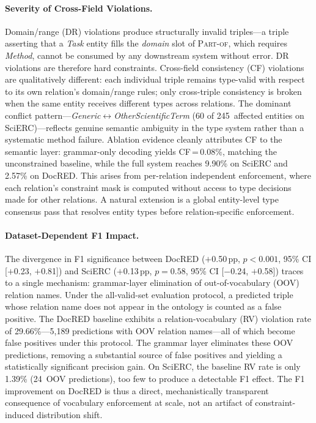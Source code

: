 \paragraph{Severity of Cross-Field Violations.}
Domain/range (DR) violations produce structurally invalid triples---a triple asserting that a \emph{Task} entity fills the \emph{domain} slot of \textsc{Part-of}, which requires \emph{Method}, cannot be consumed by any downstream system without error.
DR violations are therefore hard constraints.
Cross-field consistency (CF) violations are qualitatively different: each individual triple remains type-valid with respect to its own relation's domain/range rules; only cross-triple consistency is broken when the same entity receives different types across relations.
The dominant conflict pattern---\emph{Generic}$\leftrightarrow$\emph{OtherScientificTerm} (60 of 245~affected entities on SciERC)---reflects genuine semantic ambiguity in the type system rather than a systematic method failure.
Ablation evidence cleanly attributes CF to the semantic layer: grammar-only decoding yields CF\,=\,0.08\%, matching the unconstrained baseline, while the full system reaches 9.90\% on SciERC and 2.57\% on DocRED.
This arises from per-relation independent enforcement, where each relation's constraint mask is computed without access to type decisions made for other relations.
A natural extension is a global entity-level type consensus pass that resolves entity types before relation-specific enforcement.


\paragraph{Dataset-Dependent F1 Impact.}
The divergence in F1 significance between DocRED ($+$0.50\,pp, $p < 0.001$, 95\% CI [$+$0.23, $+$0.81]) and SciERC ($+$0.13\,pp, $p = 0.58$, 95\% CI [$-$0.24, $+$0.58]) traces to a single mechanism: grammar-layer elimination of out-of-vocabulary (OOV) relation names.
Under the all-valid-set evaluation protocol, a predicted triple whose relation name does not appear in the ontology is counted as a false positive.
The DocRED baseline exhibits a relation-vocabulary (RV) violation rate of 29.66\%---5{,}189 predictions with OOV relation names---all of which become false positives under this protocol.
The grammar layer eliminates these OOV predictions, removing a substantial source of false positives and yielding a statistically significant precision gain.
On SciERC, the baseline RV rate is only 1.39\% (24~OOV predictions), too few to produce a detectable F1 effect.
The F1 improvement on DocRED is thus a direct, mechanistically transparent consequence of vocabulary enforcement at scale, not an artifact of constraint-induced distribution shift.
